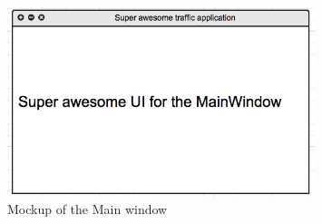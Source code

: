 \begin{figure}[!ht]
	\caption{Mockup of the Main window}
	\label{fig:mainwindow}
	\centering
	\includegraphics[width=0.8\textwidth]{figures/mainwindow}
\end{figure}

